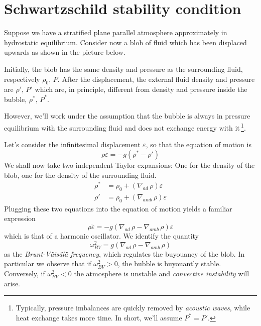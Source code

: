 \section{Schwartzschild stability condition}
Suppose we have a stratified plane parallel atmosphere approximately in hydrostatic equilibrium. Consider now a blob of fluid which has been displaced upwards as shown in the picture below.
\par Initially, the blob has the same density and pressure as the surrounding fluid, respectively $\rho_{0},\,P$. After the displacement, the external fluid density and pressure are $\rho',\,P'$ which are, in principle, different from density and pressure inside the bubble, $\rho^{*},\,P^{*}$.
\par However, we'll work under the assumption that the bubble is always in pressure equilibrium with the surrounding fluid and does not exchange energy with it\,\footnote{Typically, pressure imbalances are quickly removed by \emph{acoustic waves}, while heat exchange takes more time. In short, we'll assume $P^{*}=P'$.}.

\par Let's consider the infinitesimal displacement $\varepsilon$, so that the equation of motion is
\begin{equation*}
    \rho\ddot{\varepsilon} = -g(\rho^{*}-\rho ')
\end{equation*}
We shall now take two independent Taylor expansions: One for the density of the blob, one for the density of the surrounding fluid.
\begin{align*}
    \rho^{*} &= \rho_{0} + (\nabla_{ad}\,\rho)\varepsilon\\
    \rho' &= \rho_{0}+(\nabla_{amb}\,\rho)\varepsilon
\end{align*}
Plugging these two equations into the equation of motion yields a familiar expression 
\begin{equation}
    \rho\ddot{\varepsilon} = -g(\nabla_{ad}\,\rho-\nabla_{amb}\,\rho)\varepsilon
    \label{eq:bruntvaisala}
\end{equation}
which is that of a harmonic oscillator. We identify the quantity 
\begin{equation*}
    \omega^{2}_{BV} = g(\nabla_{ad}\,\rho-\nabla_{amb}\,\rho)
\end{equation*}
as the \emph{Brunt-Väisälä frequency}, which regulates the buyouancy of the blob. In particular we observe that if $\omega^{2}_{BV} > 0$, the bubble is buyouantly stable. Conversely, if $\omega^{2}_{BV} < 0$ the atmosphere is unstable and \emph{convective instability} will arise.
